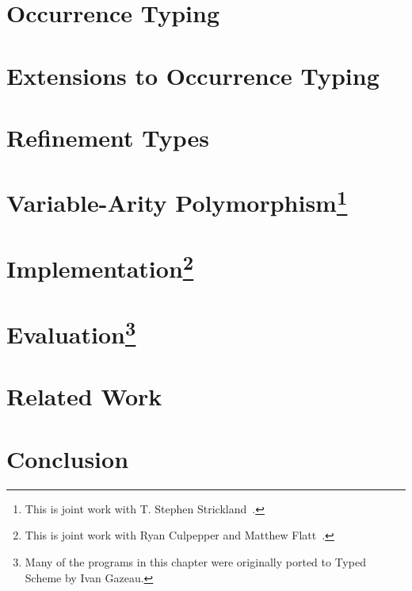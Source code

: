 \documentclass[12pt,final,oldfontcommands]{memoir}
\begin{document}
\chapter{Occurrence Typing}
\label{chap:occur}


\pathtrue

\chapter{Extensions to Occurrence Typing}
\label{chap:occur-extend}


\logictrue




\chapter{Refinement Types}
\label{chap:refinement}



\chapter[Variable-Arity Polymorphism]{Variable-Arity Polymorphism\footnote{This is joint work with T. Stephen Strickland~\cite{sthf:variable-arity}.}
}
\label{chap:dots}
{


}
\chapter[Implementation]{Implementation\footnote{This is joint work
    with Ryan Culpepper and Matthew Flatt~\cite{ctf:macros}.}}
\label{chap:impl}




\chapter[Evaluation]{Evaluation\footnote{Many of the programs in this chapter were
   originally ported to Typed Scheme by Ivan Gazeau.}}
\label{chap:exp}
\label{chap:eval}


\chapter{Related Work}
\label{chap:related}
\def\lateff{latent filter}
\def\lexeff{visible filter}
\def\subpred{sub-filter}



\chapter{Conclusion}
\label{chap:conclusion}



%





\end{document}
